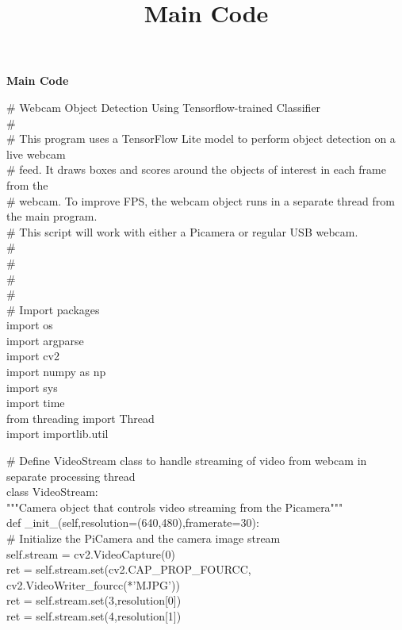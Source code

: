 \appendix
\title{Main Code}

\begin{center}
    \textbf{Main Code}
\end{center}

\# Webcam Object Detection Using Tensorflow-trained Classifier\\ 
\#\\
\# This program uses a TensorFlow Lite model to perform object detection on a live webcam\\
\# feed. It draws boxes and scores around the objects of interest in each frame from the\\
\# webcam. To improve FPS, the webcam object runs in a separate thread from the main program.\\
\# This script will work with either a Picamera or regular USB webcam.\\
\#\\
\#\\
\#\\
\#\\
\# Import packages\\
import os\\
import argparse\\
import cv2\\
import numpy as np\\
import sys\\
import time\\
from threading import Thread\\
import importlib.util\\

\vspace{2mm}

\# Define VideoStream class to handle streaming of video from webcam in separate processing thread\\
class VideoStream:\\
    """Camera object that controls video streaming from the Picamera"""\\
    def \_init\_(self,resolution=(640,480),framerate=30):\\
        \# Initialize the PiCamera and the camera image stream\\
        self.stream = cv2.VideoCapture(0)\\
        ret = self.stream.set(cv2.CAP\_PROP\_FOURCC,\\ cv2.VideoWriter\_fourcc({*}'MJPG'))\\
        ret = self.stream.set(3,resolution[0])\\
        ret = self.stream.set(4,resolution[1])\\
            
